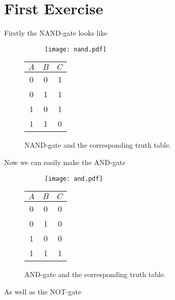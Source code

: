 \section{First Exercise}
Firstly the NAND-gate looks like
\begin{figure}[H]
    \singlespacing
    \begin{subfigure}[]{0.45\textwidth}
        \flushright
        \texttt{[image: nand.pdf]}
    \end{subfigure}
    \hfill
   \begin{subtable}[]{0.45\textwidth}
        \flushleft
        \begin{tabular}{ccc}
            \toprule
           $A$ & $B$ & $C$\\
            \midrule
            0 & 0 & 1\\
            0 & 1 & 1\\
            1 & 0 & 1\\
            1 & 1 & 0\\
            \bottomrule
            
        \end{tabular}
   \end{subtable}
   \caption{NAND-gate and the corresponding truth table.}
\end{figure}
Now we can easily make the AND-gate
\begin{figure}[H]
    \singlespacing
    \begin{subfigure}[]{0.45\textwidth}
        \flushright
        \texttt{[image: and.pdf]}
    \end{subfigure}
    \hfill
   \begin{subtable}[]{0.45\textwidth}
        \flushleft
        \begin{tabular}{ccc}
            \toprule
            $A$ & $B$ & $C$\\
            \midrule
            0 & 0 & 0\\
            0 & 1 & 0\\
            1 & 0 & 0\\
            1 & 1 & 1\\
            \bottomrule
            
        \end{tabular}
   \end{subtable}
   \caption{AND-gate and the corresponding truth table.}
\end{figure}
As well as the NOT-gate
